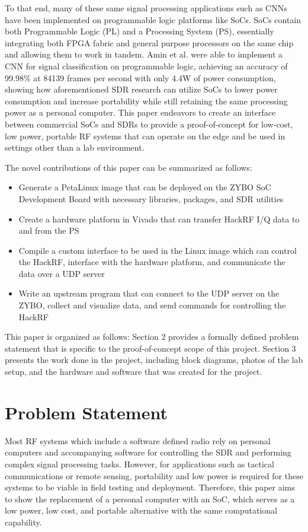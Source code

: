 \documentclass[conference]{IEEEtran}
\begin{document}
To that end, many of these same signal processing applications such as CNNs have been
implemented on programmable logic platforms like SoCs. SoCs contain both Programmable Logic (PL) and a Processing System (PS), essentially 
integrating both FPGA fabric and general purpose processors on the same chip and allowing them to work in tandem. Amin et al. were able to implement a CNN for signal classification
on programmable logic, achieving an accuracy of 99.98\% at 84139 frames per second with only 4.4W of power consumption, showing how aforementioned SDR research can utilize
SoCs to lower power consumption and increase portability while still retaining the same processing power as a personal computer. This paper endeavors to create an interface
between commercial SoCs and SDRs to provide a proof-of-concept for low-cost, low power, portable RF systems that can operate on the edge and be used in settings other than a lab environment.

The novel contributions of this paper can be summarized as follows:
\begin{itemize}
  \item Generate a PetaLinux image that can be deployed on the ZYBO SoC Development Board with necessary libraries, packages, and SDR utilities
  \item Create a hardware platform in Vivado that can transfer HackRF I/Q data to and from the PS
  \item Compile a custom interface to be used in the Linux image which can control the HackRF, interface with the hardware platform, and communicate the data over a UDP server
  \item Write an upstream program that can connect to the UDP server on the ZYBO, collect and visualize data, and send commands for controlling the HackRF
\end{itemize}

This paper is organized as follows: Section 2 provides a formally defined problem statement that is specific to the proof-of-concept scope of this project.
Section 3 presents the work done in the project, including block diagrams, photos of the lab setup, and the hardware and software that was created for the project.

\section{Problem Statement}
Most RF systems which include a software defined radio rely on personal computers and accompanying software for controlling the SDR and performing complex signal processing tasks.
However, for applications such as tactical communications or remote sensing, portability and low power is required for these systems to be viable in field testing and deployment.
Therefore, this paper aims to show the replacement of a personal computer with an SoC, which serves as a low power, low cost, and portable alternative with the same computational capability.
\end{document}

